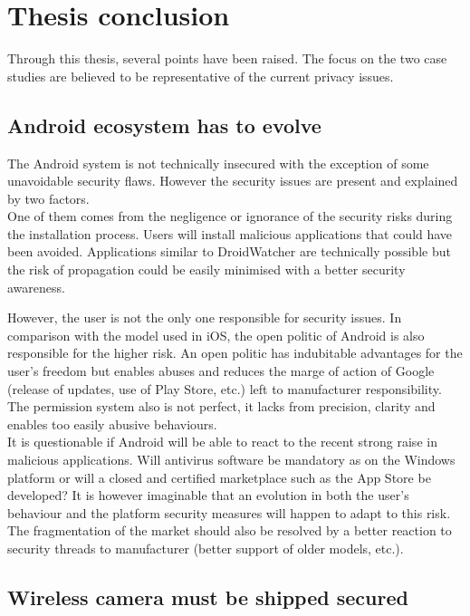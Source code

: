 \chapter{Thesis conclusion}
\label{chap:thesis-ccl}


Through this thesis, several points have been raised.
The focus on the two case studies are believed to be representative of the current privacy issues.

\section{Android ecosystem has to evolve}

The Android system is not technically insecured with the exception of some unavoidable security flaws.
However the security issues are present and explained by two factors.\\

One of them comes from the negligence or ignorance of the security risks during the installation process.
Users will install malicious applications that could have been avoided.
Applications similar to DroidWatcher are technically possible but the risk of propagation could be easily minimised with a better security awareness.

However, the user is not the only one responsible for security issues.
In comparison with the model used in iOS, the open politic of Android is also responsible for the higher risk.
An open politic has indubitable advantages for the user's freedom but enables abuses and reduces the marge of action of Google (release of updates, use of Play Store, etc.) left to manufacturer responsibility.
The permission system also is not perfect, it lacks from precision, clarity and enables too easily abusive behaviours.\\

It is questionable if Android will be able to react to the recent strong raise in malicious applications.
Will antivirus software be mandatory as on the Windows platform or will a closed and certified marketplace such as the App Store be developed?
It is however imaginable that an evolution in both the user's behaviour and the platform security measures will happen to adapt to this risk.
The fragmentation of the market should also be resolved by a better reaction to security threads to manufacturer (better support of older models, etc.).

\section{Wireless camera must be shipped secured}

